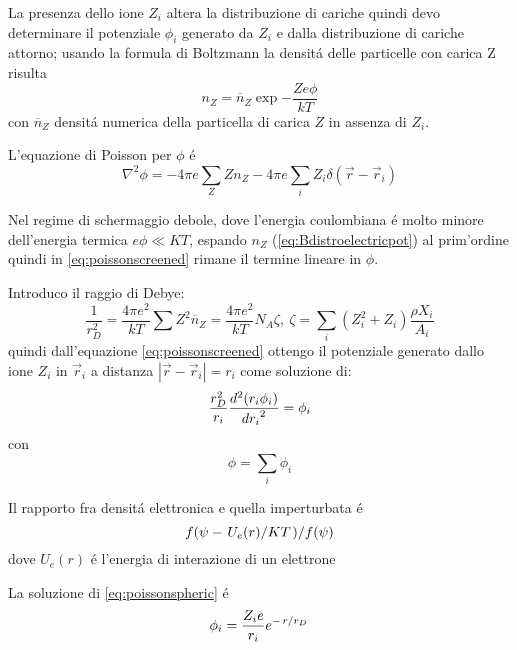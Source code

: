 \documentclass[../main.tex]{subfiles}
\begin{document}
La presenza dello ione $Z_i$ altera la distribuzione di cariche quindi devo determinare il potenziale $\phi_i$ generato da $Z_i$ e dalla distribuzione di cariche attorno; usando la formula di Boltzmann la densit\'a delle particelle con carica Z risulta
\begin{equation}\label{eq:Bdistroelectricpot}
n_Z=\overline{n}_Z\exp{-\frac{Ze\phi}{kT}}
\end{equation}
con $\overline{n}_Z$ densit\'a numerica della particella di carica $Z$ in assenza di $Z_i$.

L'equazione di Poisson per $\phi$ \'e
\begin{equation}\label{eq:poissonscreened}
\nabla^2\phi=-4\pi e\sum_Z Zn_Z-4\pi e\sum_i Z_i\delta(\vec{r}-\vec{r}_i)
\end{equation}

Nel regime di schermaggio debole, dove l'energia coulombiana \'e molto minore dell'energia termica $e\phi\ll KT$, espando $n_Z$ (\eqref{eq:Bdistroelectricpot}) al prim'ordine quindi in \eqref{eq:poissonscreened} rimane il termine lineare in $\phi$.

Introduco il raggio di Debye:
\begin{equation}
\frac{1}{r_D^2}=\frac{4\pi e^2}{kT}\sum Z^2\overline{n}_Z=\frac{4\pi e^2}{kT}N_A\zeta,\ \zeta=\sum_{i}(Z_i^2+Z_i)\frac{\rho X_i}{A_i}\label{eq:debyeradius}
\end{equation}
quindi dall'equazione \eqref{eq:poissonscreened} ottengo il potenziale generato dallo ione $Z_i$ in $\vec{r}_i$ a distanza $|\vec{r}-\vec{r}_i|=r_i$ come soluzione di:
\begin{equation}\label{eq:poissonspheric}
\frac{r_D^2}{r_i}\TtwoDy{r_i}{(r_i\phi_i)}=\phi_i
\end{equation}
con
\begin{equation}
\phi=\sum_i\phi_i
\end{equation}

\begin{workout}
Il rapporto fra densit\'a elettronica e quella imperturbata \'e
\begin{equation}
\midfrac{f(\psi-\midfrac{U_e(r)}{KT})}{f(\psi)}
\end{equation}
dove $U_e(r)$ \'e l'energia di interazione di un elettrone
\end{workout}

La soluzione di \eqref{eq:poissonspheric} \'e
\begin{equation}\label{eq:screenedpotential}
\phi_i=\frac{Z_ie}{r_i}\exp{-\midfrac{r}{r_D}}
\end{equation}
\end{document}
